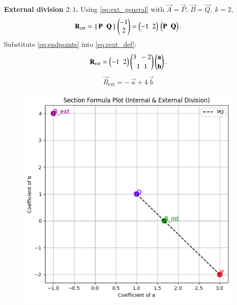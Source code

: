 \documentclass[article,12pt,onecolumn]{IEEEtran}
\theoremstyle{remark}
\begin{document}
\noindent \textbf{External division \(2:1\).}
Using \eqref{eq:ext_general} with \(\vec A=\vec P,\ \vec B=\vec Q,\ k=2\),
\begin{equation}
\mathbf R_{\text{ext}}
=\,[\,\mathbf P\;\;\mathbf Q\,]\,
\begin{pmatrix}-1\\ 2\end{pmatrix}
=\begin{pmatrix}-1 \;\; 2\end{pmatrix}\,\begin{pmatrix}\mathbf P \;\; \mathbf Q\end{pmatrix}.
\label{eq:rext_def}
\end{equation}
Substitute \eqref{eq:endpoints} into \eqref{eq:rext_def}:
\begin{equation}
\mathbf R_{\text{ext}}
=
\begin{pmatrix}-1 \;\; 2\end{pmatrix}
\begin{pmatrix}3 \;\; -2 \\[2pt] 1 \;\; 1\end{pmatrix}
\begin{pmatrix}\mathbf a \\[2pt] \mathbf b\end{pmatrix}.
\label{eq:rext_sub}
\end{equation}
\begin{equation}
\boxed{\;\vec R_{\text{ext}}=-\,\vec a+4\,\vec b\;}
\label{eq:rext_final}
\end{equation}
\begin{figure}[H]
    \centering
    \includegraphics[width=\columnwidth]{figs/mg1plot.png}
\end{figure}
\end{document}
